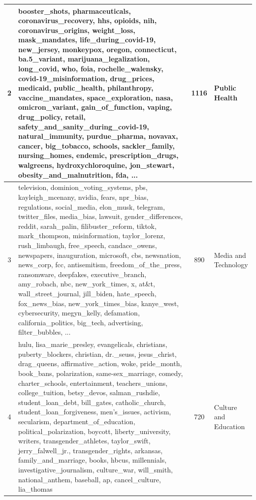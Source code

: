 \begin{tiny}
\begin{longtable}{c p{} c p{}}
2 & booster\_shots, pharmaceuticals, coronavirus\_recovery, hhs, opioids, nih, coronavirus\_origins, weight\_loss, mask\_mandates, life\_during\_covid-19, new\_jersey, monkeypox, oregon, connecticut, ba.5\_variant, marijuana\_legalization, long\_covid, who, foia, rochelle\_walensky, covid-19\_misinformation, drug\_prices, medicaid, public\_health, philanthropy, vaccine\_mandates, space\_exploration, nasa, omicron\_variant, gain\_of\_function, vaping, drug\_policy, retail, safety\_and\_sanity\_during\_covid-19, natural\_immunity, purdue\_pharma, novavax, cancer, big\_tobacco, schools, sackler\_family, nursing\_homes, endemic, prescription\_drugs, walgreens, hydroxychloroquine, jon\_stewart, obesity\_and\_malnutrition, fda, ... & 1116 & Public Health \\
\midrule

3 & television, dominion\_voting\_systems, pbs, kayleigh\_mcenany, nvidia, fears, npr\_bias, regulations, social\_media, elon\_musk, telegram, twitter\_files, media\_bias, lawsuit, gender\_differences, reddit, sarah\_palin, filibuster\_reform, tiktok, mark\_thompson, misinformation, taylor\_lorenz, rush\_limbaugh, free\_speech, candace\_owens, newspapers, inauguration, microsoft, cbs, newsnation, news\_corp, fcc, antisemitism, freedom\_of\_the\_press, ransomware, deepfakes, executive\_branch, amy\_robach, nbc, new\_york\_times, x, at\&t, wall\_street\_journal, jill\_biden, hate\_speech, fox\_news\_bias, new\_york\_times\_bias, kanye\_west, cybersecurity, megyn\_kelly, defamation, california\_politics, big\_tech, advertising, filter\_bubbles, ... & 890 & Media and Technology \\
\midrule

4 & hulu, lisa\_marie\_presley, evangelicals, christians, puberty\_blockers, christian, dr.\_seuss, jesus\_christ, drag\_queens, affirmative\_action, woke, pride\_month, book\_bans, polarization, same-sex\_marriage, comedy, charter\_schools, entertainment, teachers\_unions, college\_tuition, betsy\_devos, salman\_rushdie, student\_loan\_debt, bill\_gates, catholic\_church, student\_loan\_forgiveness, men's\_issues, activism, secularism, department\_of\_education, political\_polarization, boycott, liberty\_university, writers, transgender\_athletes, taylor\_swift, jerry\_falwell\_jr., transgender\_rights, arkansas, family\_and\_marriage, books, hbcus, millennials, investigative\_journalism, culture\_war, will\_smith, national\_anthem, baseball, ap, cancel\_culture, lia\_thomas & 720 & Culture and Education \\
\midrule


\end{longtable}
\end{tiny}
